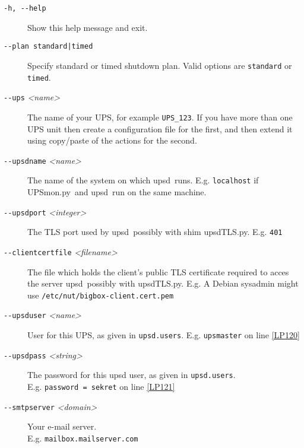 \documentclass[12pt]{article}
\newcommand{\upsd}{\mbox{\textcolor{UPSDCOLOUR}{upsd}}}
\newcommand{\upsdTLS}{\mbox{\textcolor{UPSDCOLOUR}{upsdTLS.py}}}
\newcommand{\UPSmon}{\mbox{\textcolor{UPSMONCOLOUR}{UPSmon.py}}}
\newcommand{\upsdusers}{\textcolor{UPSDCOLOUR}{\texttt{upsd.users}}}
\begin{document}
\begin{description}

\item[\texttt{-h, -\/-help}] \hspace{7mm} Show this help message and exit.

\item[\texttt{-\/-plan standard|timed}] \hspace{5mm} Specify standard or timed
  shutdown plan. Valid options are \texttt{standard} or \texttt{timed}.

\item[\texttt{-\/-ups} \textit{<name>}] \hspace{7mm} The name of your UPS, for
  example \texttt{UPS\_123}.  If you have more than one UPS unit then create a
  configuration file for the first, and then extend it using copy/paste of the
  actions for the second.

\item[\texttt{-\/-upsdname} \textit{<name>}] \hspace{7mm} The name of the
  system on which \upsd\ runs. E.g. \texttt{localhost} if \UPSmon\ and
  \upsd\ run on the same machine.

\item[\texttt{-\/-upsdport} \textit{<integer>}] \hspace{7mm} The TLS port used
  by \upsd\ possibly with shim \upsdTLS. E.g. \texttt{401}

\item[\texttt{-\/-clientcertfile} \textit{<filename>}] \hspace{5mm} The file which
  holds the client's public TLS certificate required to acces the server
  \upsd\ possibly with \upsdTLS.
  E.g. A Debian sysadmin might use \texttt{/etc/nut/bigbox-client.cert.pem}

\item[\texttt{-\/-upsduser} \textit{<name>}] \hspace{7mm} User for this UPS,
  as given in \upsdusers. E.g.  \texttt{upsmaster} on line \ref{LP120}

\item[\texttt{-\/-upsdpass} \textit{<string>}] \hspace{7mm} The password for
  this upsd user, as given in \upsdusers. \\ E.g.  \texttt{password = sekret}
  on line \ref{LP121}

\item[\texttt{-\/-smtpserver} \textit{<domain>}] \hspace{7mm} Your e-mail
  server. \\ E.g. \texttt{mailbox.mailserver.com}


\end{description}
\end{document}

